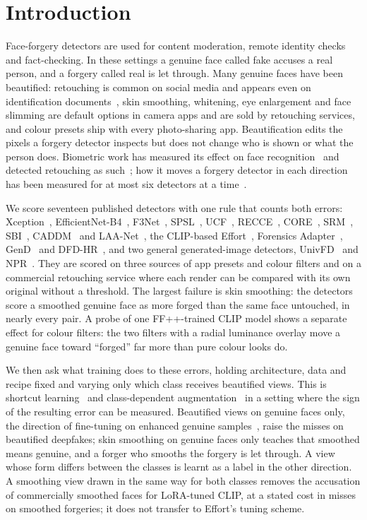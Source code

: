 \documentclass[conference]{IEEEtran}
\begin{document}
\section{Introduction}
Face-forgery detectors are used for content moderation, remote identity checks and fact-checking. In these settings a genuine
face called fake accuses a real person, and a forgery called real is let through. Many genuine faces have been beautified:
retouching is common on social media and appears even on identification documents~\cite{bharati2016,rathgeb2019}, skin
smoothing, whitening, eye enlargement and face slimming are default options in camera apps and are sold by retouching
services, and colour presets ship with every photo-sharing app. Beautification edits the pixels a forgery detector inspects
but does not change who is shown or what the person does. Biometric work has measured its effect on face
recognition~\cite{rathgeb2019} and detected retouching as such~\cite{bharati2016,jain2018}; how it moves a forgery detector in
each direction has been measured for at most six detectors at a time~\cite{libourel2024,saeed2025,concas2025}.

We score seventeen published detectors with one rule that counts both errors: Xception~\cite{xception},
EfficientNet-B4~\cite{efficientnet}, F3Net~\cite{f3net}, SPSL~\cite{spsl}, UCF~\cite{ucf}, RECCE~\cite{recce}, CORE~\cite{core},
SRM~\cite{srm}, SBI~\cite{sbi}, CADDM~\cite{caddm} and LAA-Net~\cite{laanet}, the CLIP-based Effort~\cite{effort}, Forensics
Adapter~\cite{forensicsadapter}, GenD~\cite{gend2026} and DFD-HR~\cite{dfdhr2026}, and two general generated-image detectors,
UnivFD~\cite{univfd} and NPR~\cite{npr}. They are scored on three sources of app presets and colour filters and on a commercial retouching service where each
render can be compared with its own original without a threshold. The largest failure is skin smoothing: the detectors score a
smoothed genuine face as more forged than the same face untouched, in nearly every pair. A probe of one FF++-trained CLIP model
shows a separate effect for colour filters: the two filters with a radial luminance overlay move a genuine face toward
``forged'' far more than pure colour looks do.

We then ask what training does to these errors, holding architecture, data and recipe fixed and varying only which class
receives beautified views. This is shortcut learning~\cite{geirhos2020} and class-dependent
augmentation~\cite{balestriero2022} in a setting where the sign of the resulting error can be measured. Beautified views on
genuine faces only, the direction of fine-tuning on enhanced genuine samples~\cite{saeed2025}, raise the misses on beautified
deepfakes; skin smoothing on genuine faces only teaches that smoothed means genuine, and a forger who smooths the forgery is
let through. A view whose form differs between the classes is learnt as a label in the other direction. A smoothing view
drawn in the same way for both classes removes the accusation of commercially smoothed faces for LoRA-tuned CLIP, at a stated
cost in misses on smoothed forgeries; it does not transfer to Effort's tuning scheme.
\end{document}
